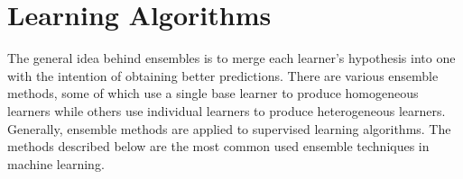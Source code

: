 \section{Learning Algorithms}

The general idea behind ensembles is to merge each learner's hypothesis into one with the intention of obtaining better predictions. There are various ensemble methods, some of which use a single base learner to produce homogeneous learners while others use individual learners to produce heterogeneous learners. Generally, ensemble methods are applied to supervised learning algorithms. The methods described below are the most common used ensemble techniques in machine learning.



